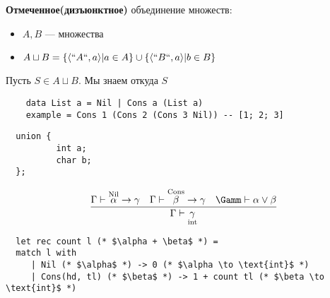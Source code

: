 \documentclass[english]{article}
\begin{document}
\begin{definition}
	\textbf{Отмеченное(дизъюнктное)} объединение множеств: \\
	\begin{itemize}
		\item \(A, B\) --- множества
		\item \(A \sqcup B = \{\langle ``A``, a \rangle| a\in A\}\cup\{\langle ``B``, a \rangle | b \in B\}\)
	\end{itemize}
	Пусть \(S \in A \sqcup B\). Мы знаем откуда \(S\)
\end{definition}
\begin{verbatim}
    data List a = Nil | Cons a (List a)
    example = Cons 1 (Cons 2 (Cons 3 Nil)) -- [1; 2; 3]
\end{verbatim}
\begin{verbatim}
  union {
          int a;
          char b;
  };
\end{verbatim}
\begin{examp}
	\[
		\frac{\Gamma \vdash \overset{\text{Nil}}{\alpha} \to \gamma\quad \Gamma \vdash \overset{\text{Cons}}{\beta} \to \gamma\quad \Gamm \vdash \alpha \vee \beta}{\Gamma \vdash \underset{\text{int}}{\gamma}}
	\]
	\begin{verbatim}
  let rec count l (* $\alpha + \beta$ *) =
  match l with
     | Nil (* $\alpha$ *) -> 0 (* $\alpha \to \text{int}$ *)
     | Cons(hd, tl) (* $\beta$ *) -> 1 + count tl (* $\beta \to \text{int}$ *)
\end{verbatim}
\end{examp}
\end{document}
